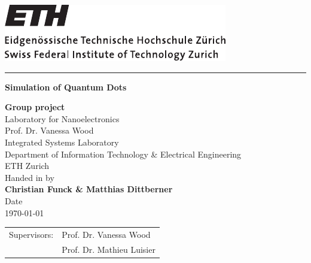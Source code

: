 \newcommand{\trtitle}{Simulation of Quantum Dots}
\newcommand{\trtype}{Group project}
\newcommand{\trprofone}{Prof. Dr. Vanessa Wood}
\newcommand{\trproftwo}{Prof. Dr. Mathieu Luisier}
\newcommand{\trresearchgroup}{Laboratory for Nanoelectronics}
\newcommand{\trinstitute}{Integrated Systems Laboratory}
\newcommand{\trdepartment}{Department of Information Technology \& Electrical Engineering}
\newcommand{\truni}{ETH Zurich}
\newcommand{\trdate}{\today}

\thispagestyle{empty}

\includegraphics[scale=0.8]{Fig/eth_logo_black.pdf}

\rule{\textwidth}{0.4pt}

\vspace{2.5cm}
\begin{center}
  \textbf{\LARGE \trtitle}
\end{center}
\vspace{2cm}

\begin{center}
  \textbf{\trtype}	\\
  \trresearchgroup	\\
  \trprofone				\\
  \trinstitute			\\
  \trdepartment			\\
  \truni						\\[0.5cm]
  Handed in by			\\
  \textbf{Christian Funck \& Matthias Dittberner}	\\[0.5cm]
  Date							\\
  \trdate						\\
\end{center}

\vspace{1cm}

\begin{center}
	\begin{tabular}{ll}
		Supervisors: & \trprofone	\\
								 & \trproftwo	\\
	\end{tabular}
\end{center}

\vfill

